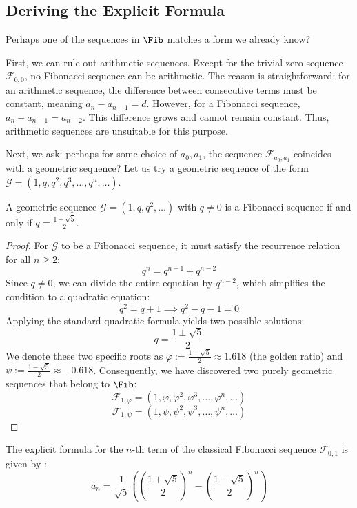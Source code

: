 \subsection{Deriving the Explicit Formula}

Perhaps one of the sequences in $\Fib$ matches a form we already know? 

First, we can rule out arithmetic sequences. Except for the trivial zero sequence $\mathcal{F}_{0,0}$, no Fibonacci sequence can be arithmetic. The reason is straightforward: for an arithmetic sequence, the difference between consecutive terms must be constant, meaning $a_n - a_{n-1} = d$. However, for a Fibonacci sequence, $a_n - a_{n-1} = a_{n-2}$. This difference grows and cannot remain constant. Thus, arithmetic sequences are unsuitable for this purpose.

Next, we ask: perhaps for some choice of $a_0, a_1$, the sequence $\mathcal{F}_{a_0, a_1}$ coincides with a geometric sequence? Let us try a geometric sequence of the form $\mathcal{G} = (1, q, q^2, q^3, \dots, q^n, \dots)$. 

\begin{lemma}
A geometric sequence $\mathcal{G} = (1, q, q^2, \dots)$ with $q \ne 0$ is a Fibonacci sequence if and only if $q = \frac{1 \pm \sqrt{5}}{2}$.
\end{lemma}

\begin{proof}
For $\mathcal{G}$ to be a Fibonacci sequence, it must satisfy the recurrence relation for all $n \ge 2$:
\[
q^n = q^{n-1} + q^{n-2}
\]
Since $q \ne 0$, we can divide the entire equation by $q^{n-2}$, which simplifies the condition to a quadratic equation:
\[
q^2 = q + 1 \implies q^2 - q - 1 = 0
\]
Applying the standard quadratic formula yields two possible solutions:
\[
q = \frac{1 \pm \sqrt{5}}{2}
\]
We denote these two specific roots as $\varphi := \frac{1 + \sqrt{5}}{2} \approx 1.618$ (the golden ratio) and $\psi := \frac{1 - \sqrt{5}}{2} \approx -0.618$. Consequently, we have discovered two purely geometric sequences that belong to $\Fib$:
\[
\mathcal{F}_{1, \varphi} = (1, \varphi, \varphi^2, \varphi^3, \dots, \varphi^n, \dots)
\]
\[
\mathcal{F}_{1, \psi} = (1, \psi, \psi^2, \psi^3, \dots, \psi^n, \dots)
\]
\end{proof}

\begin{theorem}
\label{thm:binet_formula}
The explicit formula for the $n$-th term of the classical Fibonacci sequence $\mathcal{F}_{0,1}$ is given by :
\[
a_n = \frac{1}{\sqrt{5}} \left( \left(\frac{1+\sqrt{5}}{2}\right)^n - \left(\frac{1-\sqrt{5}}{2}\right)^n \right)
\]
\end{theorem}


